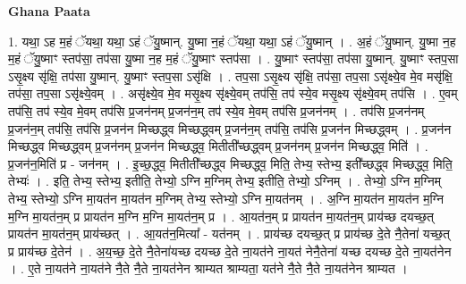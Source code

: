 \documentclass[17pt]{extarticle}
\begin{document}
\textbf{Ghana Paata } \newline

1. यथा॒ ऽह म॒हं ॅयथा॒ यथा॒ ऽहं ॅयु॒ष्मान्. यु॒ष्मा न॒हं ॅयथा॒ यथा॒ ऽहं ॅयु॒ष्मान् । . अ॒हं ॅयु॒ष्मान्. यु॒ष्मा न॒ह म॒हं ॅयु॒ष्माꣳ स्तप॑सा॒ तप॑सा यु॒ष्मा न॒ह म॒हं ॅयु॒ष्माꣳ स्तप॑सा । . यु॒ष्माꣳ स्तप॑सा॒ तप॑सा यु॒ष्मान्. यु॒ष्माꣳ स्तप॒सा ऽसृ॒क्ष्य सृ॑क्षि॒ तप॑सा यु॒ष्मान्. यु॒ष्माꣳ स्तप॒सा ऽसृ॑क्षि । . तप॒सा ऽसृ॒क्ष्य सृ॑क्षि॒ तप॑सा॒ तप॒सा ऽसृ॑क्ष्ये॒व मे॒व मसृ॑क्षि॒ तप॑सा॒ तप॒सा ऽसृ॑क्ष्ये॒वम् । . असृ॑क्ष्ये॒व मे॒व मसृ॒क्ष्य सृ॑क्ष्ये॒वम् तप॑सि॒ तप॑ स्ये॒व मसृ॒क्ष्य सृ॑क्ष्ये॒वम् तप॑सि । . ए॒वम् तप॑सि॒ तप॑ स्ये॒व मे॒वम् तप॑सि प्र॒जन॑नम् प्र॒जन॑न॒म् तप॑ स्ये॒व मे॒वम् तप॑सि प्र॒जन॑नम् । . तप॑सि प्र॒जन॑नम् प्र॒जन॑न॒म् तप॑सि॒ तप॑सि प्र॒जन॑न मिच्छद्ध्व मिच्छद्ध्वम् प्र॒जन॑न॒म् तप॑सि॒ तप॑सि प्र॒जन॑न मिच्छद्ध्वम् । . प्र॒जन॑न मिच्छद्ध्व मिच्छद्ध्वम् प्र॒जन॑नम् प्र॒जन॑न मिच्छद्ध्व॒ मितीती᳚च्छद्ध्वम् प्र॒जन॑नम् प्र॒जन॑न मिच्छद्ध्व॒ मिति॑ । . प्र॒जन॑न॒मिति॑ प्र - जन॑नम् । . इ॒च्छ॒द्ध्व॒ मितीती᳚च्छद्ध्व मिच्छद्ध्व॒ मिति॒ तेभ्य॒ स्तेभ्य॒ इती᳚च्छद्ध्व मिच्छद्ध्व॒ मिति॒ तेभ्यः॑ । . इति॒ तेभ्य॒ स्तेभ्य॒ इतीति॒ तेभ्यो॒ ऽग्नि म॒ग्निम् तेभ्य॒ इतीति॒ तेभ्यो॒ ऽग्निम् । . तेभ्यो॒ ऽग्नि म॒ग्निम् तेभ्य॒ स्तेभ्यो॒ ऽग्नि मा॒यत॑न मा॒यत॑न म॒ग्निम् तेभ्य॒ स्तेभ्यो॒ ऽग्नि मा॒यत॑नम् । . अ॒ग्नि मा॒यत॑न मा॒यत॑न म॒ग्नि म॒ग्नि मा॒यत॑न॒म् प्र प्रायत॑न म॒ग्नि म॒ग्नि मा॒यत॑न॒म् प्र । . आ॒यत॑न॒म् प्र प्रायत॑न मा॒यत॑न॒म् प्राय॑च्छ दयच्छ॒त् प्रायत॑न मा॒यत॑न॒म् प्राय॑च्छत् । . आ॒यत॑न॒मित्या᳚ - यत॑नम् । . प्राय॑च्छ दयच्छ॒त् प्र प्राय॑च्छ दे॒ते नै॒तेना॑ यच्छ॒त् प्र प्राय॑च्छ दे॒तेन॑ । . अ॒य॒च्छ॒ दे॒ते नै॒तेना॑यच्छ दयच्छ दे॒ते ना॒यत॑ने ना॒यत॑ नेनै॒तेना॑ यच्छ दयच्छ दे॒ते ना॒यत॑नेन । . ए॒ते ना॒यत॑ने ना॒यत॑ने नै॒ते नै॒ते ना॒यत॑नेन श्राम्यत श्राम्यता॒ यत॑ने नै॒ते नै॒ते ना॒यत॑नेन श्राम्यत । \newline
\end{document}
